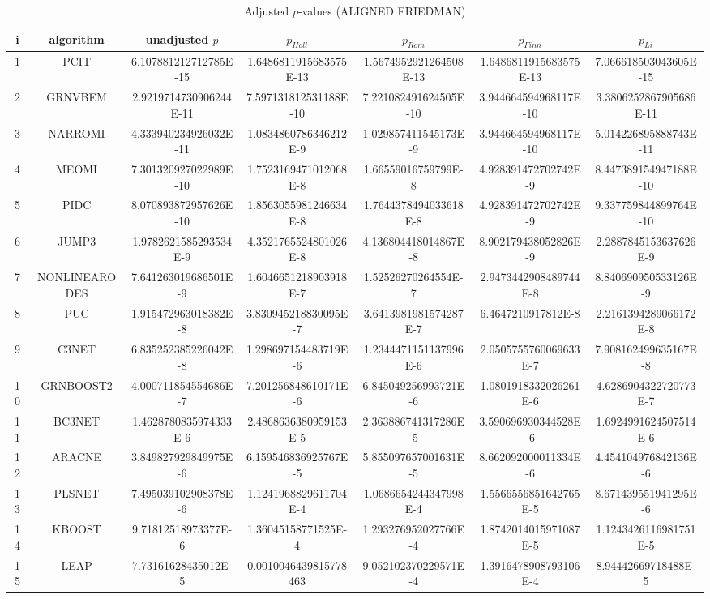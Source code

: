 \documentclass[a4paper,10pt]{article}
\begin{document}
\begin{landscape}
\begin{table}[!htp]
\centering\scriptsize
\caption{Adjusted $p$-values (ALIGNED FRIEDMAN)}
\begin{tabular}{ccccccc}
i&algorithm&unadjusted $p$&$p_{Holl}$&$p_{Rom}$&$p_{Finn}$&$p_{Li}$\\
\hline
1&PCIT&6.107881212712785E-15&1.6486811915683575E-13&1.5674952921264508E-13&1.6486811915683575E-13&7.066618503043605E-15\\
2&GRNVBEM&2.9219714730906244E-11&7.597131812531188E-10&7.221082491624505E-10&3.944664594968117E-10&3.3806252867905686E-11\\
3&NARROMI&4.333940234926032E-11&1.0834860786346212E-9&1.029857411545173E-9&3.944664594968117E-10&5.014226895888743E-11\\
4&MEOMI&7.301320927022989E-10&1.7523169471012068E-8&1.66559016759799E-8&4.928391472702742E-9&8.447389154947188E-10\\
5&PIDC&8.070893872957626E-10&1.8563055981246634E-8&1.7644378494033618E-8&4.928391472702742E-9&9.337759844899764E-10\\
6&JUMP3&1.9782621585293534E-9&4.3521765524801026E-8&4.136804418014867E-8&8.902179438052826E-9&2.2887845153637626E-9\\
7&NONLINEARODES&7.641263019686501E-9&1.6046651218903918E-7&1.52526270264554E-7&2.9473442908489744E-8&8.840690950533126E-9\\
8&PUC&1.915472963018382E-8&3.830945218830095E-7&3.6413981981574287E-7&6.4647210917812E-8&2.2161394289066172E-8\\
9&C3NET&6.835252385226042E-8&1.298697154483719E-6&1.2344471151137996E-6&2.0505755760069633E-7&7.908162499635167E-8\\
10&GRNBOOST2&4.000711854554686E-7&7.201256848610171E-6&6.845049256993721E-6&1.0801918332026261E-6&4.6286904322720773E-7\\
11&BC3NET&1.4628780835974333E-6&2.4868636380959153E-5&2.363886741317286E-5&3.590696930344528E-6&1.6924991624507514E-6\\
12&ARACNE&3.849827929849975E-6&6.159546836925767E-5&5.855097657001631E-5&8.662092000011334E-6&4.454104976842136E-6\\
13&PLSNET&7.495039102908378E-6&1.1241968829611704E-4&1.0686654244347998E-4&1.5566556851642765E-5&8.671439551941295E-6\\
14&KBOOST&9.71812518973377E-6&1.36045158771525E-4&1.293276952027766E-4&1.8742014015971087E-5&1.1243426116981751E-5\\
15&LEAP&7.73161628435012E-5&0.0010046439815778463&9.052102370229571E-4&1.3916478908793106E-4&8.94442669718488E-5\\

\end{tabular}
\end{table}
\end{landscape}
\end{document}
